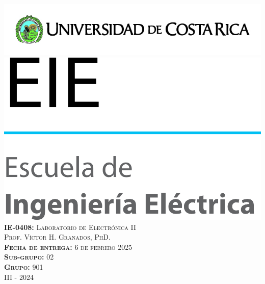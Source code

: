 \begin{titlepage}

\newcommand{\HRule}{\rule{\linewidth}{0.5mm}} %

\center %
 

\includegraphics[scale=.5]{figs/portada/UCR_logo.jpg}\\[1.5cm] %
\includegraphics[scale=2.4]{figs/portada/EIE_logo.png}\\[1.5cm] %
\textsc{\Large \textbf{IE-0408:} Laboratorio de Electrónica II}\\[.5cm] %
\textsc{\large Prof. Víctor H. Granados, PhD.}\\[.5cm]
\textsc{\large \textbf{Fecha de entrega:} 6 de febrero 2025}\\[.5cm] 
\textsc{\large \textbf{Sub-grupo:} 02}\\[.5cm]
\textsc{\large \textbf{Grupo:} 901}\\[.5cm]
\textsc{\large III - 2024}\\[1cm]


\end{titlepage}
